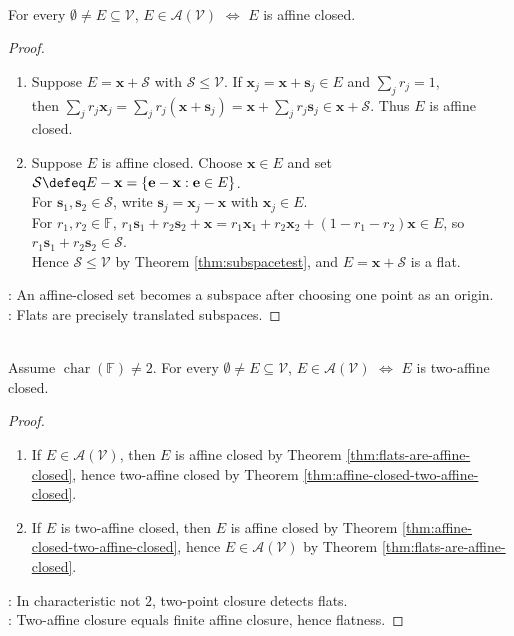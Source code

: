 \begin{theorem} \label{thm:flats-are-affine-closed} \\
For every $\emptyset\neq E\subseteq\mathcal{V}$, $E\in\mathcal{A}(\mathcal{V})$ $\iff$ $E$ is affine closed.
\begin{proof}
\begin{enumerate}[label=(\roman*)]
\setlength{\itemsep}{0pt}
\item Suppose $E=\mathbf{x}+\mathcal{S}$ with $\mathcal{S}\leq\mathcal{V}$. If $\mathbf{x}_j=\mathbf{x}+\mathbf{s}_j\in E$ and $\sum_j r_j=1$,\\
then $\sum_j r_j\mathbf{x}_j =\sum_j r_j(\mathbf{x}+\mathbf{s}_j) =\mathbf{x}+\sum_j r_j\mathbf{s}_j\in\mathbf{x}+\mathcal{S}$. Thus $E$ is affine closed.
\item Suppose $E$ is affine closed. Choose $\mathbf{x}\in E$ and set $\mathcal{S}\defeq E-\mathbf{x}=\{\mathbf{e}-\mathbf{x}:\mathbf{e}\in E\}$.\\
For $\mathbf{s}_1,\mathbf{s}_2\in\mathcal{S}$, write $\mathbf{s}_j=\mathbf{x}_j-\mathbf{x}$ with $\mathbf{x}_j\in E$.\\
For $r_1,r_2\in\mathbb{F}$, $r_1\mathbf{s}_1+r_2\mathbf{s}_2+\mathbf{x} =r_1\mathbf{x}_1+r_2\mathbf{x}_2+(1-r_1-r_2)\mathbf{x}\in E$, so $r_1\mathbf{s}_1+r_2\mathbf{s}_2\in\mathcal{S}$.\\
Hence $\mathcal{S}\leq\mathcal{V}$ by Theorem \ref{thm:subspacetest}, and $E=\mathbf{x}+\mathcal{S}$ is a flat.
\end{enumerate}
: An affine-closed set becomes a subspace after choosing one point as an origin.\\
: Flats are precisely translated subspaces.
\end{proof}
\end{theorem}

\begin{theorem} \label{thm:flats-are-two-affine-closed} \\
Assume $\operatorname{char}(\mathbb{F})\neq2$. For every $\emptyset\neq E\subseteq\mathcal{V}$, $E\in\mathcal{A}(\mathcal{V})$ $\iff$ $E$ is two-affine closed.
\begin{proof}
\begin{enumerate}[label=(\roman*)]
\setlength{\itemsep}{0pt}
\item If $E\in\mathcal{A}(\mathcal{V})$, then $E$ is affine closed by Theorem \ref{thm:flats-are-affine-closed}, hence two-affine closed by Theorem \ref{thm:affine-closed-two-affine-closed}.
\item If $E$ is two-affine closed, then $E$ is affine closed by Theorem \ref{thm:affine-closed-two-affine-closed}, hence $E\in\mathcal{A}(\mathcal{V})$ by Theorem \ref{thm:flats-are-affine-closed}.
\end{enumerate}
: In characteristic not $2$, two-point closure detects flats.\\
: Two-affine closure equals finite affine closure, hence flatness.
\end{proof}
\end{theorem}

